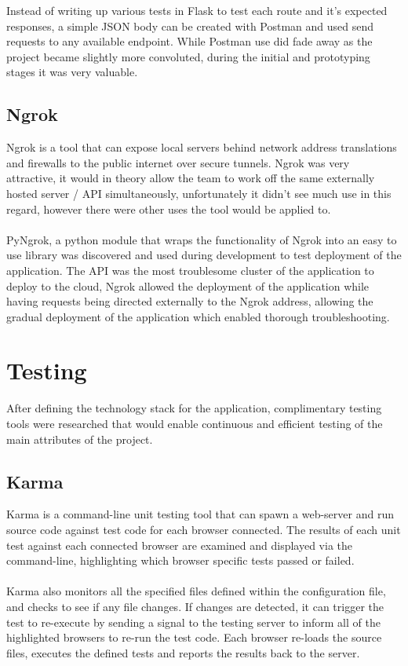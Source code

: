 Instead of writing up various tests in Flask to test each route and it's expected responses, a simple JSON body can be created with Postman and used send requests to any available endpoint. While Postman use did fade away as the project became slightly more convoluted, during the initial and prototyping stages it was very valuable.

\subsection{Ngrok}
Ngrok is a tool that can expose local servers behind network address translations and firewalls to the public internet over secure tunnels. Ngrok was very attractive, it would in theory allow the team to work off the same externally hosted server / API simultaneously, unfortunately it didn't see much use in this regard, however there were other uses the tool would be applied to.

\paragraph{}
PyNgrok, a python module that wraps the functionality of Ngrok into an easy to use library was discovered and used during development to test deployment of the application. The API was the most troublesome cluster of the application to deploy to the cloud, Ngrok allowed the deployment of the application while having requests being directed externally to the Ngrok address, allowing the gradual deployment of the application which enabled thorough troubleshooting.

\section{Testing}
After defining the technology stack for the application, complimentary testing tools were researched that would enable continuous and efficient testing of the main attributes of the project.

\subsection{Karma}
Karma is a command-line unit testing tool that can spawn a web-server and run source code against test code for each browser connected. The results of each unit test against each connected browser are examined and displayed via the command-line, highlighting which browser specific tests passed or failed.

\paragraph{}
Karma also monitors all the specified files defined within the configuration file, and checks to see if any file changes. If changes are detected, it can trigger the test to re-execute by sending a signal to the testing server to inform all of the highlighted browsers to re-run the test code. Each browser re-loads the source files, executes the defined tests and reports the results back to the server.

